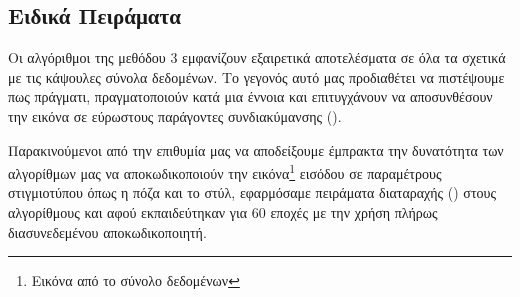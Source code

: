 \begin{table}[h]
    \begin{center}
    \end{center}
    \caption[]{\label{tab:method_3_all}Οι επιδόσεις των καλύτερων αλγορίθμων της μεθόδου 3 για το κάθε σύνολο δεδομένων.} 
\end{table}

\subsection{Ειδικά Πειράματα}
Οι αλγόριθμοι της μεθόδου 3 εμφανίζουν εξαιρετικά αποτελέσματα σε όλα τα σχετικά με τις κάψουλες σύνολα δεδομένων. Το γεγονός αυτό μας προδιαθέτει να πιστέψουμε πως πράγματι, πραγματοποιούν κατά μια έννοια  και επιτυγχάνουν να αποσυνθέσουν την εικόνα σε εύρωστους παράγοντες συνδιακύμανσης ().\par

Παρακινούμενοι από την επιθυμία μας να αποδείξουμε έμπρακτα την δυνατότητα των αλγορίθμων μας να αποκωδικοποιούν την εικόνα\footnote{Εικόνα από το σύνολο δεδομένων } εισόδου σε παραμέτρους στιγμιοτύπου όπως η πόζα και το στύλ, εφαρμόσαμε πειράματα διαταραχής () στους αλγορίθμους  και  αφού εκπαιδεύτηκαν για 60 εποχές με την χρήση πλήρως διασυνεδεμένου αποκωδικοποιητή.\par

